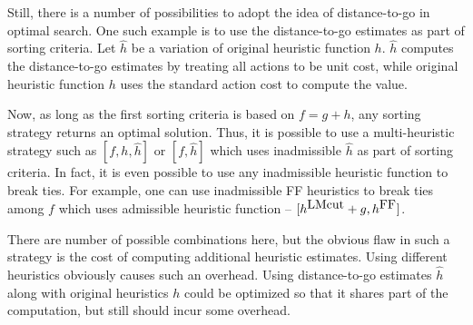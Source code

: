 Still, there is a number of possibilities to adopt the idea of
distance-to-go in optimal search. One such example is to use the
distance-to-go estimates as part of sorting criteria.
% 
Let $\hat{h}$ be a variation of original heuristic function
$h$. $\hat{h}$ computes the distance-to-go estimates by treating all
actions to be unit cost, while original heuristic function $h$ uses the
standard action cost to compute the value.

Now, as long as the first sorting criteria is based on $f=g+h$, any
sorting strategy returns an optimal solution. Thus, it is possible to
use a multi-heuristic strategy such as $[f,h,\hat{h}]$ or $[f,\hat{h}]$
which uses inadmissible $\hat{h}$ as part of sorting criteria.
In fact, it is even possible to use any inadmissible heuristic function to break
ties. For example, one can use inadmissible FF heuristics to break ties
among $f$ which uses admissible \lmcut heuristic function -- $[h^{\mbox{LMcut}}+g,h^{\mbox{FF}}]$.

There are number of possible combinations here, but the obvious flaw in
such a strategy is the cost of computing additional heuristic
estimates. Using different heuristics obviously causes such an
overhead. Using distance-to-go estimates $\hat{h}$ along with original
heuristics $h$ could be optimized so that it shares part of the
computation, but still should incur some overhead.

